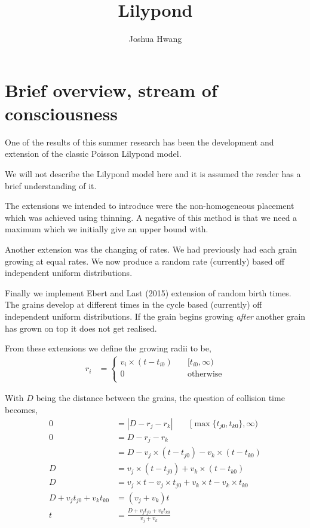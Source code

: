 \documentclass{article}
\title{Lilypond}
\author{Joshua Hwang}
\begin{document}
\section{Brief overview, stream of consciousness}
One of the results of this summer research has been the
development and extension of the classic Poisson Lilypond model.

We will not describe the Lilypond model here and it is assumed the
reader has a brief understanding of it.

The extensions we intended to introduce were the non-homogeneous
placement which was achieved using thinning.
A negative of this method is that we need a maximum which we initially
give an upper bound with.

Another extension was the changing of rates. We had previously had
each grain growing at equal rates. We now produce a random rate
(currently) based off independent uniform distributions.

Finally we implement Ebert and Last (2015) extension of random birth
times. The grains develop at different times in the cycle based
(currently) off independent uniform distributions. If the grain
begins growing \emph{after} another grain has grown on top it does not
get realised.

From these extensions we define the growing radii to be,
\begin{align*}
    r_i
    &=
    \begin{cases}
        v_i \times (t - t_{i0}) \quad &[t_{i0}, \infty) \\
        0 &\text{otherwise} \\
    \end{cases}
\end{align*}

With $D$ being the distance between the grains,
the question of collision time becomes,
\begin{align*}
    0 &= |D - r_j - r_k| \qquad [\max\{t_{j0}, t_{k0}\}, \infty) \\
    0 &= D - r_j - r_k \\
    &= D - v_j \times (t - t_{j0}) - v_k \times (t - t_{k0}) \\
    D &= v_j \times (t - t_{j0}) + v_k \times (t - t_{k0}) \\
    D &= v_j \times t - v_j \times t_{j0} + v_k \times t - v_k \times t_{k0} \\
    D + v_j t_{j0} + v_k t_{k0} &= (v_j + v_k)t \\
    t &= \frac{D + v_j t_{j0} + v_k t_{k0}}{v_j + v_k} \\
\end{align*}
\end{document}

